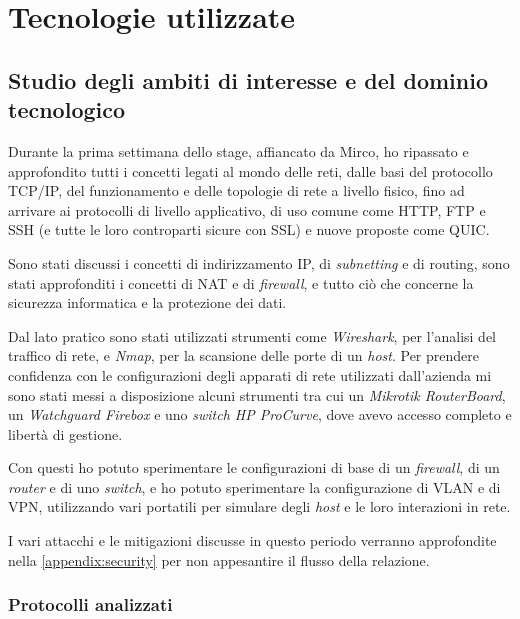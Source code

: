 \chapter{Tecnologie utilizzate}
\label{cap:tecnologie}


\section{Studio degli ambiti di interesse e del dominio tecnologico}

Durante la prima settimana dello stage, affiancato da Mirco, ho ripassato e approfondito tutti i concetti legati al mondo delle reti, dalle basi del protocollo TCP/IP, del funzionamento e delle topologie di rete a livello fisico, fino ad arrivare ai protocolli di livello applicativo, di uso comune come HTTP, FTP e SSH (e tutte le loro controparti sicure con SSL) e nuove proposte come QUIC.

Sono stati discussi i concetti di indirizzamento IP, di \emph{subnetting} e di routing, sono stati approfonditi i concetti di NAT e di \emph{firewall}, e tutto ciò che concerne la sicurezza informatica e la protezione dei dati.

Dal lato pratico sono stati utilizzati strumenti come \emph{Wireshark}, per l'analisi del traffico di rete, e \emph{Nmap}, per la scansione delle porte di un \emph{host}. Per prendere confidenza con le configurazioni degli apparati di rete utilizzati dall'azienda mi sono stati messi a disposizione alcuni strumenti tra cui un \emph{Mikrotik RouterBoard}, un \emph{Watchguard Firebox} e uno \emph{switch HP ProCurve}, dove avevo accesso completo e libertà di gestione.

Con questi ho potuto sperimentare le configurazioni di base di un \emph{firewall}, di un \emph{router} e di uno \emph{switch}, e ho potuto sperimentare la configurazione di VLAN e di VPN, utilizzando vari portatili per simulare degli \emph{host} e le loro interazioni in rete.

I vari attacchi e le mitigazioni discusse in questo periodo verranno approfondite nella \autoref{appendix:security} per non appesantire il flusso della relazione.

\subsection{Protocolli analizzati}

